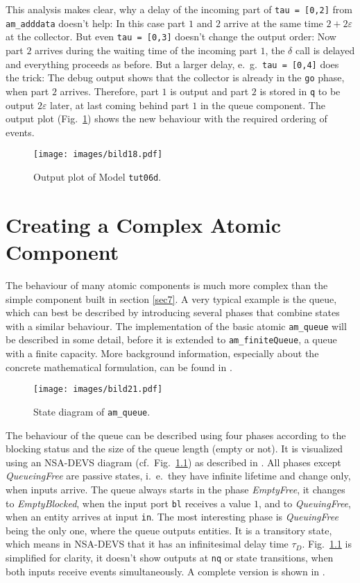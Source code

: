 \documentclass[12pt,oneside,a4paper,bibtotoc,BCOR=0pt,DIV=20]{scrreprt}
\newcommand{\cft}[1]{\mbox{\texttt{#1}}}   %
\newcommand{\epsi}{\varepsilon}
\begin{document}
This analysis makes clear, why a delay of the incoming part of \cft{tau =
  [0,2]} from \cft{am\_adddata} doesn't help: In this case part $1$ and $2$
arrive at the same time $2 + 2\epsi$ at the collector. But even \cft{tau =
  [0,3]} doesn't change the output order: Now part $2$ arrives during the
waiting time of the incoming part $1$, the $\delta$ call is delayed and
everything proceeds as before. But a larger delay, e.\ g.\ \cft{tau = [0,4]}
does the trick: The debug output shows that the collector is already in the
\cft{go} phase, when part $2$ arrives. Therefore, part $1$ is output and part
$2$ is stored in \cft{q} to be output $2\epsi$ later, at last coming behind
part $1$ in the queue component.  The output plot (Fig.\ \ref{fig_18}) shows
the new behaviour with the required ordering of events.

\begin{figure}[ht]
\centering
\texttt{[image: images/bild18.pdf]}
\caption{Output plot of Model \cft{tut06d}.}
\label{fig_18}
\end{figure}


\chapter{Creating a Complex Atomic Component} \label{sec9}

The behaviour of many atomic components is much more complex than the simple
component built in section \ref{sec7}. A very typical example is the queue,
which can best be described by introducing several phases that combine states
with a similar behaviour. The implementation of the basic atomic
\cft{am\_queue} will be described in some detail, before it is extended to
\cft{am\_finiteQueue}, a queue with a finite capacity. More background
information, especially about the concrete mathematical formulation, can be
found in \cite{nsaExamples}.

\begin{figure}[ht]
\centering
\texttt{[image: images/bild21.pdf]}
\caption{State diagram of \cft{am\_queue}.}
\label{fig_21}
\end{figure}

The behaviour of the queue can be described using four phases according to the
blocking status and the size of the queue length (empty or not). It is
visualized using an NSA-DEVS diagram (cf.\ Fig.\ \ref{fig_21}) as described in
\cite{nsaDiagram}. All phases except \emph{QueueingFree} are passive states,
i.\ e.\ they have infinite lifetime and change only, when inputs arrive. The
queue always starts in the phase \emph{EmptyFree}, it changes to
\emph{EmptyBlocked}, when the input port \cft{bl} receives a value $1$, and to
\emph{QueuingFree}, when an entity arrives at input \cft{in}.  The most
interesting phase is \emph{QueuingFree} being the only one, where the queue
outputs entities. It is a transitory state, which means in NSA-DEVS that it has
an infinitesimal delay time $\tau_D$. Fig.\ \ref{fig_21} is simplified for
clarity, it doesn't show outputs at \cft{nq} or state transitions, when
both inputs receive events simultaneously. A complete version is shown in
\cite{nsaDiagram}.
\end{document}
